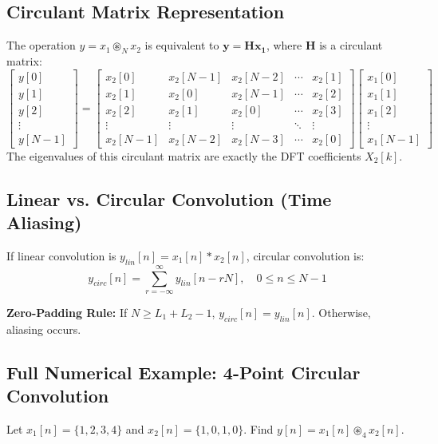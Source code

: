 \documentclass[11pt,a4paper]{article}
\begin{document}
\subsection{Circulant Matrix Representation}
The operation $y = x_1 \circledast_N x_2$ is equivalent to $\mathbf{y} = \mathbf{H} \mathbf{x_1}$, where $\mathbf{H}$ is a circulant matrix:
\begin{equation}
\begin{bmatrix} y[0] \\ y[1] \\ y[2] \\ \vdots \\ y[N-1] \end{bmatrix} = 
\begin{bmatrix} 
x_2[0] & x_2[N-1] & x_2[N-2] & \cdots & x_2[1] \\ 
x_2[1] & x_2[0] & x_2[N-1] & \cdots & x_2[2] \\ 
x_2[2] & x_2[1] & x_2[0] & \cdots & x_2[3] \\ 
\vdots & \vdots & \vdots & \ddots & \vdots \\ 
x_2[N-1] & x_2[N-2] & x_2[N-3] & \cdots & x_2[0] 
\end{bmatrix} 
\begin{bmatrix} x_1[0] \\ x_1[1] \\ x_1[2] \\ \vdots \\ x_1[N-1] \end{bmatrix}
\end{equation}
The eigenvalues of this circulant matrix are exactly the DFT coefficients $X_2[k]$.

\subsection{Linear vs. Circular Convolution (Time Aliasing)}
If linear convolution is $y_{lin}[n] = x_1[n] * x_2[n]$, circular convolution is:
\begin{equation}
y_{circ}[n] = \sum_{r=-\infty}^{\infty} y_{lin}[n - rN], \quad 0 \le n \le N-1
\end{equation}

\textbf{Zero-Padding Rule:} If $N \ge L_1 + L_2 - 1$, $y_{circ}[n] = y_{lin}[n]$. Otherwise, aliasing occurs.

\subsection{Full Numerical Example: 4-Point Circular Convolution}
Let $x_1[n] = \{1, 2, 3, 4\}$ and $x_2[n] = \{1, 0, 1, 0\}$. Find $y[n] = x_1[n] \circledast_4 x_2[n]$.
\end{document}

